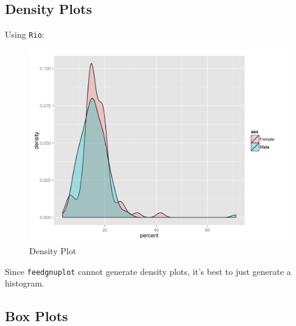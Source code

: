 \documentclass[
]{book}
\newenvironment{Shaded}{\begin{snugshade}}{\end{snugshade}}
\newcommand{\ExtensionTok}[1]{#1}
\newcommand{\KeywordTok}[1]{\textcolor[rgb]{0.13,0.29,0.53}{\textbf{#1}}}
\newcommand{\NormalTok}[1]{#1}
\newcommand{\OperatorTok}[1]{\textcolor[rgb]{0.81,0.36,0.00}{\textbf{#1}}}
\newcommand{\StringTok}[1]{\textcolor[rgb]{0.31,0.60,0.02}{#1}}
\theoremstyle{definition}
\theoremstyle{definition}
\theoremstyle{definition}
\theoremstyle{remark}
\begin{document}
\hypertarget{density-plots}{%
\subsection{Density Plots}\label{density-plots}}

Using \texttt{Rio}:

\begin{Shaded}
\end{Shaded}

\begin{figure}

{\centering \includegraphics[width=32.81in]{images/rio-densityplot} 

}

\caption{Density Plot}\label{fig:unnamed-chunk-28}
\end{figure}

Since \texttt{feedgnuplot} cannot generate density plots, it's best to just generate a histogram.

\hypertarget{box-plots}{%
\subsection{Box Plots}\label{box-plots}}
\end{document}
